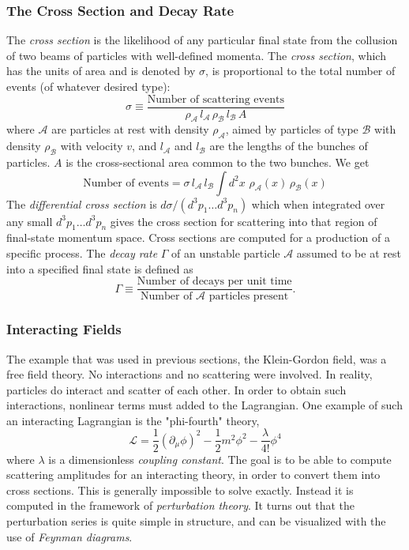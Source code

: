 \subsubsection{The Cross Section and Decay Rate}

The \emph{cross section} is the likelihood of any particular final state from the collusion of two beams of particles with well-defined momenta. The \emph{cross section}, which has the units of area and is denoted by $\sigma$, is proportional to the total number of events (of whatever desired type):
\begin{equation}
\sigma \equiv \frac{\text{Number of scattering events}}{\rho_\mathcal{A}\,l_\mathcal{A}\,\rho_\mathcal{B}\,l_\mathcal{B}\,A}
\end{equation}
where $\mathcal{A}$ are particles at rest with density $\rho_\mathcal{A}$, aimed by particles of type $\mathcal{B}$ with density $\rho_\mathcal{B}$ with velocity $v$, and $l_\mathcal{A}$ and $l_\mathcal{B}$ are the lengths of the bunches of particles. $A$ is the cross-sectional area common to the two bunches. We get
\begin{equation}
\text{Number of events} = \sigma\,l_\mathcal{A}\,l_\mathcal{B}\int d^2 x\,\, \rho_\mathcal{A}(x)\,\rho_\mathcal{B}(x)
\end{equation}
The \emph{differential cross section} is $d\sigma/(d^3 p_1\ldots d^3p_n)$ which when integrated over any small $d^3 p_1\ldots d^3p_n$ gives the cross section for scattering into that region of final-state momentum space. Cross sections are computed for a production of a specific process. The \emph{decay rate} $\Gamma$ of an unstable particle $\mathcal{A}$ assumed to be at rest into a specified final state is defined as
\begin{equation}
\Gamma \equiv \frac{\text{Number of decays per unit time}}{\text{Number of $\mathcal{A}$ particles present}}.
\end{equation}

\subsubsection{Interacting Fields}

The example that was used in previous sections, the Klein-Gordon field, was a free field theory. No interactions and no scattering were involved. In reality, particles do interact and scatter of each other. In order to obtain such interactions, nonlinear terms must added to the Lagrangian. One example of such an interacting Lagrangian is the "phi-fourth" theory,
\begin{equation}
\mathcal{L} = \frac{1}{2}(\partial_\mu\phi)^2-\frac{1}{2}m^2\phi^2 -\frac{\lambda}{4!}\phi^4
\end{equation}
where $\lambda$ is a dimensionless \emph{coupling constant}. The goal is to be able to compute scattering amplitudes for an interacting theory, in order to convert them into cross sections. This is generally impossible to solve exactly. Instead it is computed in the framework of \emph{perturbation theory}. It turns out that the perturbation series is quite simple in structure, and can be visualized with the use of \emph{Feynman diagrams}.

